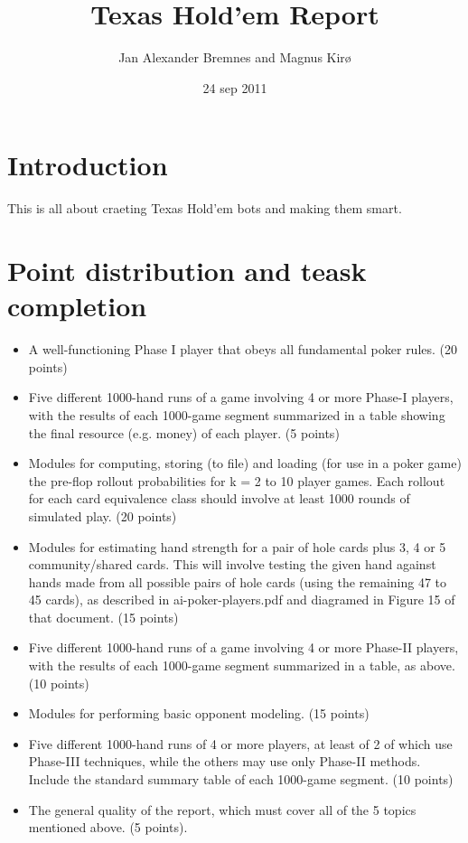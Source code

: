 \documentclass[12pt]{article}
\title{Texas Hold'em Report}
\author{Jan Alexander Bremnes and Magnus Kirø}
\date{24 sep 2011}
\begin{document}
\maketitle

\tableofcontents

\section*{Introduction}
This is all about craeting Texas Hold'em bots and making them smart.

\section*{Point distribution and teask completion}
\begin{itemize}
\item A well-functioning Phase I player that obeys all fundamental poker rules. (20 points)

\item Five different 1000-hand runs of a game involving 4 or more Phase-I players, with the results of each 1000-game segment summarized in a table showing the final resource (e.g. money) of each player. (5 points)

\item Modules for computing, storing (to file) and loading (for use in a poker game) the pre-flop rollout probabilities for k = 2 to 10 player games. Each rollout for each card equivalence class should involve at least 1000 rounds of simulated play. (20 points)

\item Modules for estimating hand strength for a pair of hole cards plus 3, 4 or 5 community/shared cards. This will involve testing the given hand against hands made from all possible pairs of hole cards (using the remaining 47 to 45 cards), as described in ai-poker-players.pdf and diagramed in Figure 15 of that document. (15 points)

\item Five different 1000-hand runs of a game involving 4 or more Phase-II players, with the results of each 1000-game segment summarized in a table, as above. (10 points)

\item Modules for performing basic opponent modeling. (15 points)

\item Five different 1000-hand runs of 4 or more players, at least of 2 of which use Phase-III techniques, while the others may use only Phase-II methods. Include the standard summary table of each 1000-game segment. (10 points)

\item The general quality of the report, which must cover all of the 5 topics mentioned above. (5 points).
\end{itemize}
\end{document}
